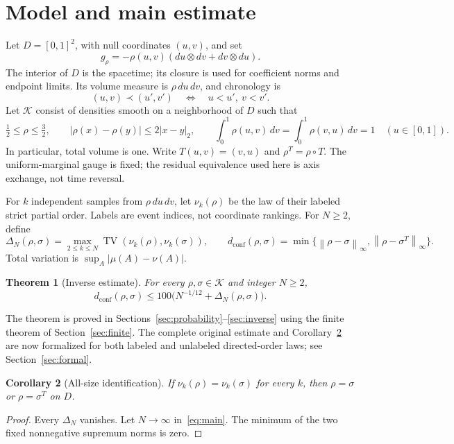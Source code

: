 \documentclass[11pt]{article}
\newtheorem{theorem}{Theorem}[section]
\newtheorem{corollary}[theorem]{Corollary}
\theoremstyle{remark}
\newcommand{\K}{\mathcal K}
\newcommand{\TV}{\operatorname{TV}}
\newcommand{\dc}{d_{\mathrm{conf}}}
\newcommand{\norm}[1]{\left\lVert #1\right\rVert_\infty}
\begin{document}
\section{Model and main estimate}
Let $D=[0,1]^2$, with null coordinates $(u,v)$, and set
\[
 g_\rho=-\rho(u,v)(du\otimes dv+dv\otimes du).
\]
The interior of $D$ is the spacetime; its closure is used for coefficient
norms and endpoint limits. Its volume measure is $\rho\,du\,dv$, and
chronology is
\[
 (u,v)\prec (u',v')\quad\Longleftrightarrow\quad u<u',\ v<v'.
\]
Let $\K$ consist of densities smooth on a neighborhood of $D$ such that
\begin{equation}\label{eq:class}
 \tfrac12\le\rho\le\tfrac32,\qquad
 |\rho(x)-\rho(y)|\le2|x-y|_2,\qquad
 \int_0^1\rho(u,v)\,dv=\int_0^1\rho(v,u)\,dv=1
 \quad(u\in[0,1]).
\end{equation}
In particular, total volume is one. Write $T(u,v)=(v,u)$ and
$\rho^T=\rho\circ T$. The uniform-marginal gauge is fixed; the residual
equivalence used here is axis exchange, not time reversal.

For $k$ independent samples from $\rho\,du\,dv$, let $\nu_k(\rho)$ be
the law of their labeled strict partial order. Labels are event indices,
not coordinate rankings. For $N\ge2$, define
\[
 \Delta_N(\rho,\sigma)=\max_{2\le k\le N}
       \TV(\nu_k(\rho),\nu_k(\sigma)),\qquad
 \dc(\rho,\sigma)=\min\{\norm{\rho-\sigma},\norm{\rho-\sigma^T}\}.
\]
Total variation is $\sup_A|\mu(A)-\nu(A)|$.

\begin{theorem}[Inverse estimate]\label{thm:main}
For every $\rho,\sigma\in\K$ and integer $N\ge2$,
\begin{equation}\label{eq:main}
 \dc(\rho,\sigma)\le100\bigl(N^{-1/12}+\Delta_N(\rho,\sigma)\bigr).
\end{equation}
\end{theorem}
The theorem is proved in Sections~\ref{sec:probability}--\ref{sec:inverse}
using the finite theorem of Section~\ref{sec:finite}. The complete
original estimate and Corollary~\ref{cor:identification} are now formalized
for both labeled and unlabeled directed-order laws; see
Section~\ref{sec:formal}.

\begin{corollary}[All-size identification]\label{cor:identification}
If $\nu_k(\rho)=\nu_k(\sigma)$ for every $k$, then
$\rho=\sigma$ or $\rho=\sigma^T$ on $D$.
\end{corollary}
\begin{proof}
Every $\Delta_N$ vanishes. Let $N\to\infty$ in~\eqref{eq:main}.
The minimum of the two fixed nonnegative supremum norms is zero.
\end{proof}
\end{document}
